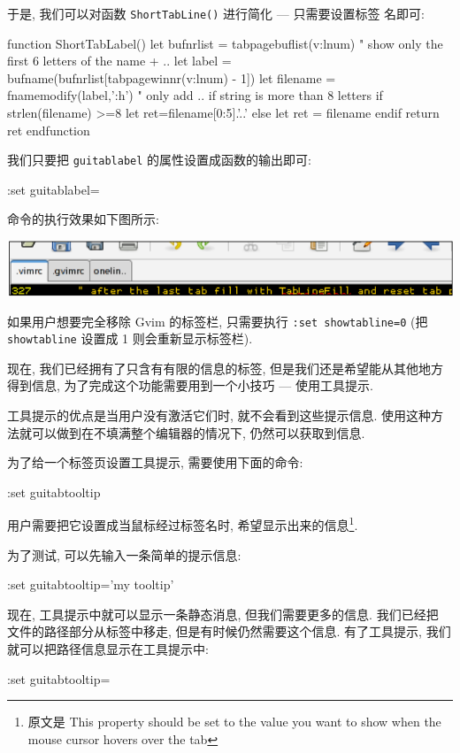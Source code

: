 于是, 我们可以对函数 \texttt{ShortTabLine()} 进行简化 --- 只需要设置标签
名即可:
\begin{vimscript}
function ShortTabLabel()
 let bufnrlist = tabpagebuflist(v:lnum)
 " show only the first 6 letters of the name + ..
 let label = bufname(bufnrlist[tabpagewinnr(v:lnum) - 1])
 let filename = fnamemodify(label,':h')
 " only add .. if string is more than 8 letters
  if strlen(filename) >=8
     let ret=filename[0:5].'..'
  else
    let ret = filename
 endif
     return ret
 endfunction
\end{vimscript}
我们只要把 \texttt{guitablabel} 的属性设置成函数的输出即可:
\begin{vimcmd}
:set guitablabel=%
\end{vimcmd}
命令的执行效果如下图所示:
\begin{center}
\includegraphics[scale=0.5]{./images/page36}
\end{center}

\begin{warning}
如果用户想要完全移除 Gvim 的标签栏, 只需要执行 \texttt{:set showtabline=0}
(把 \texttt{showtabline} 设置成 1 则会重新显示标签栏).
\end{warning}

现在, 我们已经拥有了只含有有限的信息的标签, 但是我们还是希望能从其他地方
得到信息, 为了完成这个功能需要用到一个小技巧 --- 使用工具提示.

工具提示的优点是当用户没有激活它们时,
就不会看到这些提示信息. 使用这种方法就可以做到在不填满整个编辑器的情况下, 
仍然可以获取到信息.

为了给一个标签页设置工具提示, 需要使用下面的命令:
\begin{vimcmd}
:set guitabtooltip
\end{vimcmd}
用户需要把它设置成当鼠标经过标签名时, 希望显示出来的信息\footnote{原文是
 This property should be set to the value you want to show when the mouse
 cursor hovers over the tab}.

为了测试, 可以先输入一条简单的提示信息:
\begin{vimcmd}
:set guitabtooltip='my tooltip'
\end{vimcmd}
现在, 工具提示中就可以显示一条静态消息, 但我们需要更多的信息. 我们已经把
文件的路径部分从标签中移走, 但是有时候仍然需要这个信息. 有了工具提示, 我们 
就可以把路径信息显示在工具提示中:
\begin{vimcmd}
:set guitabtooltip=%
\end{vimcmd}

